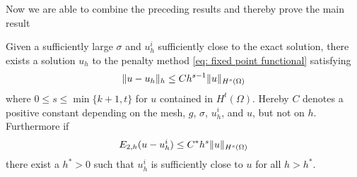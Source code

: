 %

Now we are able to combine the preceding results and thereby prove the main result
\begin{theorem}\label{main result}
	Given a sufficiently large $\sigma$ and $u_h^i$ sufficiently close to the exact solution, there exists a solution $u_h$ to the penalty method \eqref{eq: fixed point functional} satisfying
	\begin{align}
		\lVert u-u_h \rVert_{h} \leq C h^{s-1} \lVert u \rVert_{H^{s}(\Omega)} \label{eq: error estimate}
	\end{align}
	where $0 \leq s \leq \min\{k+1, t\}$ for $u$ contained in $H^t(\Omega)$. Hereby $C$ denotes a positive constant depending on the mesh, $g$, $\sigma$, $u^i_h$, and $u$, but not on $h$.\\
	Furthermore if
	\begin{align}
		E_{2,h}(u-u_h^i) \leq C^* h^{s}\lVert u \rVert_{H^{s}(\Omega)} \label{eq: estimate error}
	\end{align}
	there exist a $h^*> 0$ such that $u_h^i$ is sufficiently close to $u$ for all $h > h^*$.
	
\end{theorem}
